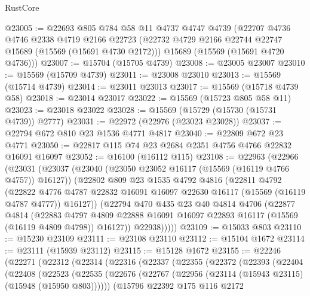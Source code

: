 \begin{lexlean}{RustCore}
\begin{coremodule}
@23005 := @22693
    @805
    @784
    @58
    @11
    @4737
    @4747
    @4739
    (@22707
      @4736
      @4746
      @2338
      @4719
      @2166
      @22723
      (@22732 @4729 @2166 @22744 @22747 @15689 (@15569 (@15691 @4730 @2172)))
      @15689
      (@15569 (@15691 @4720 @4736)))
@23007 := @15704 (@15705 @4739)
@23008 := @23005 @23007
@23010 := @15569 (@15709 @4739)
@23011 := @23008 @23010
@23013 := @15569 (@15714 @4739)
@23014 := @23011 @23013
@23017 := @15569 (@15718 @4739 @58)
@23018 := @23014 @23017
@23022 := @15569 (@15723 @805 @58 @11)
@23023 := @23018 @23022
@23028 := @15569 (@15729 (@15730 (@15731 @4739)) @2777)
@23031 := @22972 (@22976 (@23023 @23028))
@23037 := @22794 @672 @810 @23 @1536 @4771 @4817
@23040 := @22809 @672 @23 @4771
@23050 := @22817 @115 @74 @23 @2684 @2351 @4756 @4766 @22832 @16091 @16097
@23052 := @16100 (@16112 @115)
@23108 := @22963
    (@22966
      (@23031
        (@23037
          (@23040 (@23050 @23052 @16117 (@15569 (@16119 @4766 @4757)) @16127))
          (@22802
            @809
            @23
            @1535
            @4792
            @4816
            (@22811
              @4792
              (@22822
                @4776
                @4787
                @22832
                @16091
                @16097
                @22630
                @16117
                (@15569 (@16119 @4787 @4777))
                @16127))
            (@22794
              @470
              @435
              @23
              @40
              @4814
              @4706
              (@22877
                @4814
                (@22883
                  @4797
                  @4809
                  @22888
                  @16091
                  @16097
                  @22893
                  @16117
                  (@15569 (@16119 @4809 @4798))
                  @16127))
              @22938)))))
@23109 := @15033 @803
@23110 := @15230 @23109
@23111 := @23108 @23110
@23112 := @15104 @1672
@23114 := @23111 (@15939 @23112)
@23115 := @15128 @1672
@23155 := @22246
    (@22271
      (@22312
        (@22314
          (@22316
            (@22337
              (@22355
                (@22372
                  (@22393
                    (@22404
                      (@22408
                        (@22523
                          (@22535
                            (@22676
                              (@22767 (@22956 (@23114 (@15943 @23115) (@15948 (@15950 @803))))))
                            (@15796
                              @22392
                              @175
                              @116
                              @2172

\end{coremodule}
\end{lexlean}
